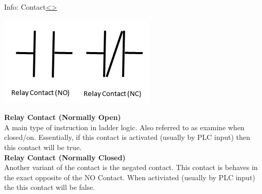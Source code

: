 \documentclass[12pt]{extarticle}
\newenvironment{instructionblock}{\Large\bgroup}{\egroup}
\newcounter{next}
\newcounter{prev}
\begin{document}
\pagebreak
{}
\begin{slide}{Info: Contact}{\hyperref[slide \theprev]{\textless}\hyperref[slide \thenext]{\textgreater}}
\begin{instructionblock}
	\begin{center}
		\includegraphics[scale=1.8]{figures/LadderDiagram02.JPG}
	\end{center}
\end{instructionblock}
\end{slide}
\vfill
\noindent
\textbf{Relay Contact (Normally Open)}\\
A main type of instruction in ladder logic. Also referred to as examine when closed/on. Essentially, if this contact is activated (usually by PLC input) then this contact will be true. \cite{OP_plcs} \\
\textbf{Relay Contact (Normally Closed)}\\
Another variant of the contact is the negated contact. This contact is behaves in the exact opposite of the NO Contact. When activiated (usually by PLC input) the this contact will be false. \cite{OP_plcs}

\end{document}
